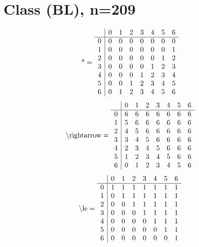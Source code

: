 \documentclass[11pt]{article}
\begin{document}
\section{Class (BL), n=209}
\[\text{*} = 
\begin{array}{r | r r r r r r r}
 & 0 & 1 & 2 & 3 & 4 & 5 & 6 \\ \hline
0 & 0 & 0 & 0 & 0 & 0 & 0 & 0 \\
1 & 0 & 0 & 0 & 0 & 0 & 0 & 1 \\
2 & 0 & 0 & 0 & 0 & 0 & 1 & 2 \\
3 & 0 & 0 & 0 & 0 & 1 & 2 & 3 \\
4 & 0 & 0 & 0 & 1 & 2 & 3 & 4 \\
5 & 0 & 0 & 1 & 2 & 3 & 4 & 5 \\
6 & 0 & 1 & 2 & 3 & 4 & 5 & 6 \\
\end{array}
\]
\[\text{\textbackslash rightarrow} = 
\begin{array}{r | r r r r r r r}
 & 0 & 1 & 2 & 3 & 4 & 5 & 6 \\ \hline
0 & 6 & 6 & 6 & 6 & 6 & 6 & 6 \\
1 & 5 & 6 & 6 & 6 & 6 & 6 & 6 \\
2 & 4 & 5 & 6 & 6 & 6 & 6 & 6 \\
3 & 3 & 4 & 5 & 6 & 6 & 6 & 6 \\
4 & 2 & 3 & 4 & 5 & 6 & 6 & 6 \\
5 & 1 & 2 & 3 & 4 & 5 & 6 & 6 \\
6 & 0 & 1 & 2 & 3 & 4 & 5 & 6 \\
\end{array}
\]
\[\text{\textbackslash le} = 
\begin{array}{r | r r r r r r r}
 & 0 & 1 & 2 & 3 & 4 & 5 & 6 \\ \hline
0 & 1 & 1 & 1 & 1 & 1 & 1 & 1 \\
1 & 0 & 1 & 1 & 1 & 1 & 1 & 1 \\
2 & 0 & 0 & 1 & 1 & 1 & 1 & 1 \\
3 & 0 & 0 & 0 & 1 & 1 & 1 & 1 \\
4 & 0 & 0 & 0 & 0 & 1 & 1 & 1 \\
5 & 0 & 0 & 0 & 0 & 0 & 1 & 1 \\
6 & 0 & 0 & 0 & 0 & 0 & 0 & 1 \\
\end{array}
\]
\end{document}
